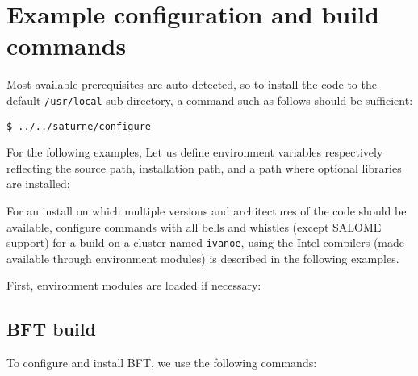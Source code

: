 \documentclass[a4paper,10pt,twoside]{article}
\begin{document}
\section{Example configuration and build commands\label{sec:config:examples}}

Most available prerequisites are auto-detected, so to install the
code to the default \texttt{/usr/local} sub-directory,
a command such as follows should be sufficient:

\texttt{\$ ../../saturne/configure}

For the following examples, Let us define environment variables respectively
reflecting the \CS source path, installation path, and a path where optional
libraries are installed:


For an install on which multiple
versions and architectures of the code should be available,
configure commands with all bells and whistles (except SALOME support) for a
build on a cluster named \texttt{ivanoe}, using the Intel compilers
(made available through environment modules) is described in the following
examples.

First, environment modules are loaded if necessary:


\subsection{BFT build\label{sec:bft:config:examples}}

To configure and install BFT, we use the following commands:

\end{document}
